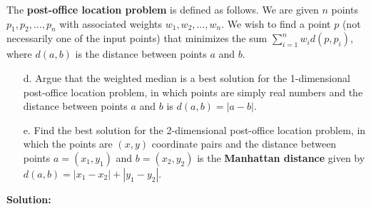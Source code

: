 \documentclass{article}
\begin{document}
The \textbf{post-office location problem} is defined as follows. We are given \( n \) points \( p_1, p_2, \ldots, p_n \) with associated weights \( w_1, w_2, \ldots, w_n \). We wish to find a point \( p \) (not necessarily one of the input points) that minimizes the sum \( \sum_{i=1}^{n} w_i d(p, p_i) \), where \( d(a, b) \) is the distance between points \( a \) and \( b \).

\begin{enumerate}
    \item[d.] Argue that the weighted median is a best solution for the 1-dimensional post-office location problem, in which points are simply real numbers and the distance between points \( a \) and \( b \) is \( d(a, b) = |a - b| \).
    \item[e.] Find the best solution for the 2-dimensional post-office location problem, in which the points are \( (x, y) \) coordinate pairs and the distance between points \( a = (x_1, y_1) \) and \( b = (x_2, y_2) \) is the \textbf{Manhattan distance} given by \( d(a, b) = |x_1 - x_2| + |y_1 - y_2| \).
\end{enumerate}
\textbf{Solution:}
\end{document}
